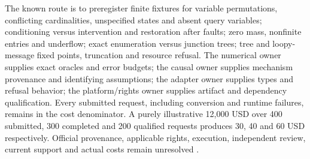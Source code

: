 The known route is to preregister finite fixtures for variable permutations,
conflicting cardinalities, unspecified states and absent query variables;
conditioning versus intervention and restoration after faults; zero mass,
nonfinite entries and underflow; exact enumeration versus junction trees;
tree and loopy-message fixed points, truncation and resource refusal.
The numerical owner supplies exact oracles and error budgets; the causal
owner supplies mechanism provenance and identifying assumptions; the
adapter owner supplies types and refusal behavior; the platform/rights owner
supplies artifact and dependency qualification. Every submitted request,
including conversion and runtime failures, remains in the cost denominator.
A purely illustrative 12,000 USD over 400 submitted, 300 completed and
200 qualified requests produces 30, 40 and 60 USD respectively.
Official provenance, applicable rights, execution, independent review, current support and actual costs remain unresolved \cite{exec24_libdai_choice}.
